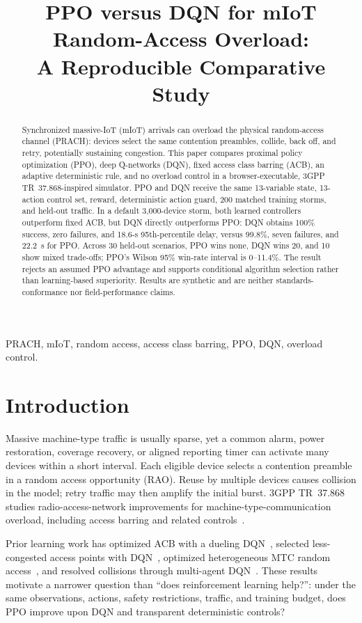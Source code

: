 \documentclass[conference]{IEEEtran}
\title{PPO versus DQN for mIoT Random-Access Overload:\\A Reproducible Comparative Study}
\author{\IEEEauthorblockN{Rao Yenamandra and Mubanga Nsofu}
\IEEEauthorblockA{DigitalTwinSim Research\\
Independent Reproducible Research Artifact}}
\begin{document}
\maketitle

\begin{abstract}
Synchronized massive-IoT (mIoT) arrivals can overload the physical random-access channel (PRACH): devices select the same contention preambles, collide, back off, and retry, potentially sustaining congestion. This paper compares proximal policy optimization (PPO), deep Q-networks (DQN), fixed access class barring (ACB), an adaptive deterministic rule, and no overload control in a browser-executable, 3GPP TR~37.868-inspired simulator. PPO and DQN receive the same 13-variable state, 13-action control set, reward, deterministic action guard, 200 matched training storms, and held-out traffic. In a default 3,000-device storm, both learned controllers outperform fixed ACB, but DQN directly outperforms PPO: DQN obtains 100\% success, zero failures, and 18.6-s 95th-percentile delay, versus 99.8\%, seven failures, and 22.2~s for PPO. Across 30 held-out scenarios, PPO wins none, DQN wins 20, and 10 show mixed trade-offs; PPO's Wilson 95\% win-rate interval is 0--11.4\%. The result rejects an assumed PPO advantage and supports conditional algorithm selection rather than learning-based superiority. Results are synthetic and are neither standards-conformance nor field-performance claims.
\end{abstract}

\begin{IEEEkeywords}
PRACH, mIoT, random access, access class barring, PPO, DQN, overload control.
\end{IEEEkeywords}

\section{Introduction}
Massive machine-type traffic is usually sparse, yet a common alarm, power restoration, coverage recovery, or aligned reporting timer can activate many devices within a short interval. Each eligible device selects a contention preamble in a random access opportunity (RAO). Reuse by multiple devices causes collision in the model; retry traffic may then amplify the initial burst. 3GPP TR~37.868 studies radio-access-network improvements for machine-type-communication overload, including access barring and related controls~\cite{tr37868}.

Prior learning work has optimized ACB with a dueling DQN~\cite{bui2020}, selected less-congested access points with DQN~\cite{bekele2021}, optimized heterogeneous MTC random access~\cite{chen2018}, and resolved collisions through multi-agent DQN~\cite{jadoon2022}. These results motivate a narrower question than ``does reinforcement learning help?'': under the same observations, actions, safety restrictions, traffic, and training budget, does PPO improve upon DQN and transparent deterministic controls?
\end{document}
